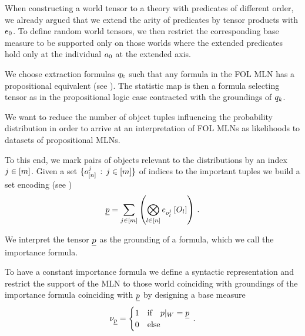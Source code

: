%
When constructing a world tensor to a theory with predicates of different order, we already argued that we extend the arity of predicates by tensor products with $e_{0}$.
To define random world tensors, we then restrict the corresponding base measure to be supported only on those worlds where the extended predicates hold only at the individual $a_{0}$ at the extended axis.



We choose extraction formulas $q_{k}$ such that any formula in the FOL MLN has a propositional equivalent (see ).
The statistic map is then a formula selecting tensor as in the propositional logic case contracted with the groundings of $q_{k}$.




	
	


We want to reduce the number of object tuples influencing the probability distribution in order to arrive at an interpretation of FOL MLNs as likelihoods to datasets of propositional MLNs.

To this end, we mark pairs of objects relevant to the distributions by an index $j\in[m]$.
Given a set $\{o_{[n]}^{j} \, : \, j\in[m] \}$ of indices to the important tuples we build a set encoding (see )
\begin{align*}
	\underline{p} = \sum_{j\in[m]} \left(
		 \bigotimes_{l\in[n]} e_{o_{l}^{j}}\left[O_{l}\right]
	 \right) \, . 
\end{align*}

We interpret the tensor $\underline{p}$ as the grounding of a formula, which we call the importance formula.

To have a constant importance formula we define a syntactic representation and restrict the support of the MLN to those world coinciding with groundings of the importance formula coinciding with $\underline{p}$ by designing a base measure
\begin{align*}
	\nu_{\underline{p}}= \begin{cases}
		1 & \text{if} \quad {p}|_{W} = \underline{p} \\
		0 & \text{else}
	\end{cases} \, . 
\end{align*}

